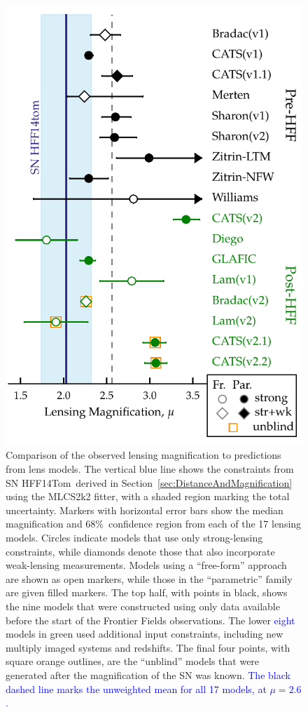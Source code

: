 \documentclass[iop]{emulateapj}
\newcommand{\change}[1]{{ \textcolor{blue}{#1}}}
\newcommand{\change}[1]{#1}
\def\tomas{HFF14Tom}
\begin{document}
\begin{figure}
\begin{center}
\includegraphics[width=\columnwidth]{snTomas_magnifications}
\caption{ 
Comparison of the observed lensing magnification to predictions from
lens models. The vertical blue line shows the constraints from
SN \tomas\ derived in Section~\ref{sec:DistanceAndMagnification} using
the MLCS2k2 fitter, with a shaded region marking the total
uncertainty. Markers with horizontal error bars show the median
magnification and 68\%\ confidence region from each of the 17 lensing
models.  Circles indicate models that use only strong-lensing
constraints, while diamonds denote those that also incorporate
weak-lensing measurements.  Models using a ``free-form''
approach are shown as open markers, while those in the ``parametric''
family are given filled markers.  The top half, with points in black, shows the nine
models that were constructed using only data available before the
start of the Frontier Fields observations. 
The lower \change{eight} models in
green used additional input constraints, including new multiply imaged
systems and redshifts.  The final four points, with square orange
outlines, are the ``unblind'' models that were generated after the
magnification of the SN was known.  
\change{The black dashed line marks the
unweighted mean for all 17 models, at $\mu=2.6$.}
\label{fig:LensingTest} }
\end{center}
\end{figure}
\end{document}
